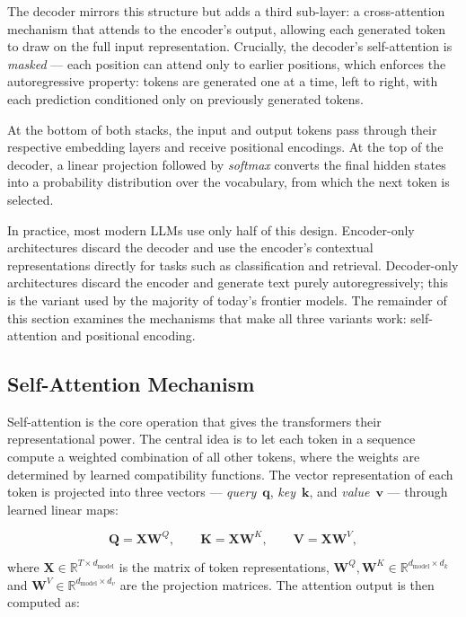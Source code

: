 The decoder mirrors this structure but adds a third sub-layer: a cross-attention mechanism that attends to the encoder's output, allowing each generated token to draw on the full input representation. Crucially, the decoder's self-attention is \emph{masked} --- each position can attend only to earlier positions, which enforces the autoregressive property: tokens are generated one at a time, left to right, with each prediction conditioned only on previously generated tokens.

At the bottom of both stacks, the input and output tokens pass through their respective embedding layers and receive positional encodings. At the top of the decoder, a linear projection followed by \emph{softmax} converts the final hidden states into a probability distribution over the vocabulary, from which the next token is selected.

In practice, most modern LLMs use only half of this design. Encoder-only architectures discard the decoder and use the encoder's contextual representations directly for tasks such as classification and retrieval. Decoder-only architectures discard the encoder and generate text purely autoregressively; this is the variant used by the majority of today's frontier models. The remainder of this section examines the mechanisms that make all three variants work: self-attention and positional encoding.

\subsection{Self-Attention Mechanism}
\label{subsec:self-attention}

Self-attention is the core operation that gives the transformers their representational power. The central idea is to let each token in a sequence compute a weighted combination of all other tokens, where the weights are determined by learned compatibility functions. The vector representation of each token is projected into three vectors --- \emph{query}~$\mathbf{q}$, \emph{key}~$\mathbf{k}$, and \emph{value}~$\mathbf{v}$ --- through learned linear maps:

\begin{equation}
    \mathbf{Q} = \mathbf{X}\mathbf{W}^Q, \qquad
    \mathbf{K} = \mathbf{X}\mathbf{W}^K, \qquad
    \mathbf{V} = \mathbf{X}\mathbf{W}^V,
    \label{eq:qkv}
\end{equation}

where $\mathbf{X} \in \mathbb{R}^{T \times d_{\text{model}}}$ is the matrix of token representations, $\mathbf{W}^Q, \mathbf{W}^K \in \mathbb{R}^{d_{\text{model}} \times d_k}$ and $\mathbf{W}^V \in \mathbb{R}^{d_{\text{model}} \times d_v}$ are the projection matrices. The attention output is then computed as:

